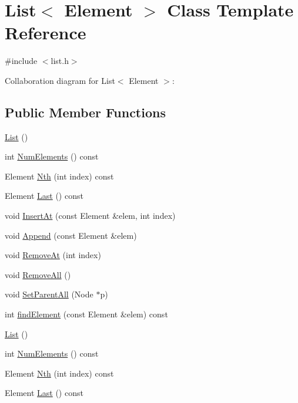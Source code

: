 \hypertarget{classList}{
\section{List$<$ Element $>$ Class Template Reference}
\label{classList}
}


{\ttfamily \#include $<$list.h$>$}



Collaboration diagram for List$<$ Element $>$:
\subsection*{Public Member Functions}
\begin{DoxyCompactItemize}
\item 
\hyperlink{classList_acdfa9a2a43d22f973fe2ecc55318847a}{List} ()
\item 
int \hyperlink{classList_ac2e9d50f703b01bf643fa6ce50837c26}{NumElements} () const 
\item 
Element \hyperlink{classList_a5eb964816de33c85e1d46658ddf8c6c4}{Nth} (int index) const 
\item 
Element \hyperlink{classList_a6d48ac6d8dc07d30d726298dd60b5b03}{Last} () const 
\item 
void \hyperlink{classList_a8d86a82c138b259da6fa0d046aed985b}{InsertAt} (const Element \&elem, int index)
\item 
void \hyperlink{classList_a473190098e38206d0125b0737245e613}{Append} (const Element \&elem)
\item 
void \hyperlink{classList_af17f72d263f90d53ea8501b5b1853470}{RemoveAt} (int index)
\item 
void \hyperlink{classList_a03ba0aa559b433acbbe1a147cf9ca905}{RemoveAll} ()
\item 
void \hyperlink{classList_ae461121db8d03106e92af9f87fa68b7d}{SetParentAll} (Node $\ast$p)
\item 
int \hyperlink{classList_a1e4827f5ca5d028662f6425f095e75c7}{findElement} (const Element \&elem) const 
\item 
\hyperlink{classList_acdfa9a2a43d22f973fe2ecc55318847a}{List} ()
\item 
int \hyperlink{classList_ac2e9d50f703b01bf643fa6ce50837c26}{NumElements} () const 
\item 
Element \hyperlink{classList_a5eb964816de33c85e1d46658ddf8c6c4}{Nth} (int index) const 
\item 
Element \hyperlink{classList_a6d48ac6d8dc07d30d726298dd60b5b03}{Last} () const 
\item 

\end{DoxyCompactItemize}
